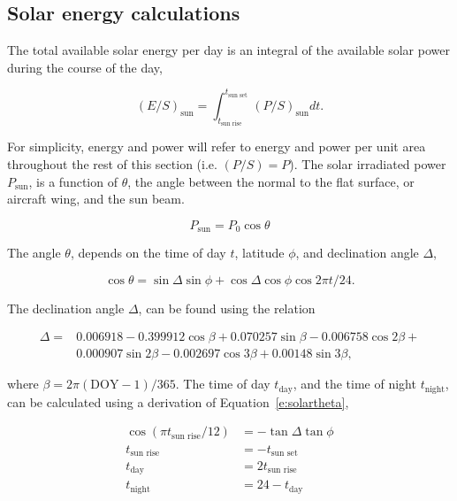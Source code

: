 \subsection{Solar energy calculations} 

The total available solar energy per day is an integral of the available solar power during the course of the day,

    \begin{equation}
        \label{e:solares}
        (E/S)_{\text{sun}} = \int_{t_{\text{sun rise}}}^{t_{\text{sun set}}} (P/S)_{\text{sun}} dt.
    \end{equation}
    
For simplicity, energy and power will refer to energy and power per unit area throughout the rest of this section (i.e. $(P/S) = P$). 
The solar irradiated power $P_{\text{sun}}$, is a function of $\theta$, the angle between the normal to the flat surface, or aircraft wing, and the sun beam.\cite{solar}

\begin{equation}
    \label{e:solarp}
    P_{\text{sun}} = P_0 \cos{\theta}
\end{equation}

The angle $\theta$, depends on the time of day $t$, latitude $\phi$, and declination angle $\Delta$,\cite{solar}

    \begin{equation}
        \label{e:solartheta}
        \cos{\theta} = \sin{\Delta} \sin{\phi} + \cos{\Delta} \cos{\phi} \cos{2\pi t/24}.
    \end{equation}

 The declination angle $\Delta$, can be found using the relation\cite{solar} 

    \begin{align}
        \label{e:solardelta}
        \Delta = &0.006918 - 0.399912 \cos{\beta} + 0.070257\sin{\beta} - 0.006758\cos{2\beta} + \nonumber \\
        & 0.000907\sin{2\beta} - 0.002697\cos{3\beta} + 0.00148\sin{3\beta},
    \end{align}

    where $\beta = 2\pi (\text{DOY}-1)/365$.
    The time of day $t_{\text{day}}$, and the time of night $t_{\text{night}}$, can be calculated using a derivation of Equation~\eqref{e:solartheta}, \cite{solar}

    \begin{align}
        \label{e:solartday}
        \cos{(\pi t_{\text{sun rise}}/12)} &= -\tan{\Delta} \tan{\phi} \\
        \label{e:solarsunrise}
        t_{\text{sun rise}} &= -t_{\text{sun set}} \\
        \label{e:solartday2}
        t_{\text{day}} &= 2t_{\text{sun rise}} \\
        \label{e:solartnight}
        t_{\text{night}} &= 24 - t_{\text{day}}
    \end{align}

